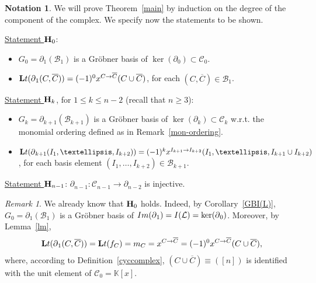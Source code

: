 \documentclass[10pt]{amsart}
\newcommand{\mbk}{\mbox{$\mathbb{K}$}}
\newcommand{\lt}{\mbox{${\bf L}{\rm t}$}}
\newcommand{\mcb}{\mbox{$\mathcal{B}$}}
\newcommand{\mcc}{\mbox{$\mathcal{C}$}}
\newcommand{\mcl}{\mbox{$\mathcal{L}$}}
\newcommand{\mbfh}{\mbox{${\bf H}$}}
\newcommand{\dif}{\mbox{$\partial$}}
\theoremstyle{definition}
\newtheorem{notation}[cdrthm]{Notation}
\theoremstyle{remark}
\newtheorem{remark}[cdrthm]{Remark}
\begin{document}
\begin{notation}\label{hyphk} 
We will prove Theorem~\ref{main} by induction on the degree of the
component of the complex. We specify now the statements to be shown.

\underline{Statement $\mbfh_0$}:
\begin{itemize}
\item[$(a)$] $G_{0}=\dif_{1}(\mcb_{1})$ is a Gr\"obner basis of
  $\ker(\dif_{0})\subset\mcc_{0}$.
\item[$(b)$] $\lt(\dif_{1}(C,\overline{C}))=
  (-1)^0x^{C\to\overline{C}}(C\cup\overline{C})$, for each
  $(C,\overline{C})\in\mcb_{1}$.
\end{itemize}

\underline{Statement $\mbfh_k$}, for $1\leq k\leq n-2$ (recall that
$n\geq 3$):
\begin{itemize}
\item[$(a)$] $G_{k}=\dif_{k+1}(\mcb_{k+1})$ is a Gr\"obner basis of
  $\ker(\dif_{k})\subset\mcc_{k}$ w.r.t. the monomial ordering defined
  as in Remark~\ref{mon-ordering}.
\item[$(b)$] $\lt(\dif_{k+1}(I_1,\ldots
  ,I_{k+2}))=(-1)^{k}x^{I_{k+1}\to I_{k+2}}(I_1,\ldots ,I_{k+1}\cup
  I_{k+2})$, for each basis element $(I_1,\ldots
  ,I_{k+2})\in\mcb_{k+1}$.
\end{itemize}

\underline{Statement $\mbfh_{n-1}$}:
$\dif_{n-1}:\mcc_{n-1}\to\dif_{n-2}$ is injective.
\end{notation}

\begin{remark}\label{degree0}
We already know that $\mbfh_0$ holds. Indeed, by
Corollary~\ref{GBI(L)}, $G_0=\dif_1(\mcb_1)$ is a Gr\"obner basis of
${\rm Im}(\dif_1)=I(\mcl)=\ker(\dif_0)$. Moreover, by Lemma~\ref{lm},
\begin{eqnarray*}
\lt(\dif_1(C,\overline{C}))=\lt(f_C)=m_C=x^{C\to\overline{C}}=
(-1)^0x^{C\to\overline{C}}(C\cup\overline{C}),
\end{eqnarray*}
where, according to Definition~\ref{cyccomplex}, $(C\cup
\overline{C})\equiv ([n])$ is identified with the unit element of
$\mcc_0=\mbk[x]$.
\end{remark}
\end{document}

